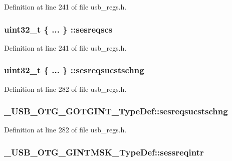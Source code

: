 Definition at line 241 of file usb\-\_\-regs.\-h.

\hypertarget{group___u_s_b___o_t_g___d_r_i_v_e_r_ga6f20faaa5eb3d10f213ac9d2d48d0452}{
\subsubsection[{sesreqscs}]{\setlength{\rightskip}{0pt plus 5cm}uint32\-\_\-t \{ ... \} \-::sesreqscs}}\label{group___u_s_b___o_t_g___d_r_i_v_e_r_ga6f20faaa5eb3d10f213ac9d2d48d0452}


Definition at line 241 of file usb\-\_\-regs.\-h.

\hypertarget{group___u_s_b___o_t_g___d_r_i_v_e_r_ga47aedfcdccf66bc5a3f43306e62526ec}{
\subsubsection[{sesreqsucstschng}]{\setlength{\rightskip}{0pt plus 5cm}uint32\-\_\-t \{ ... \} \-::sesreqsucstschng}}\label{group___u_s_b___o_t_g___d_r_i_v_e_r_ga47aedfcdccf66bc5a3f43306e62526ec}


Definition at line 282 of file usb\-\_\-regs.\-h.

\hypertarget{group___u_s_b___o_t_g___d_r_i_v_e_r_gae1b7683211f53c2ae86a79983383a49f}{
\subsubsection[{sesreqsucstschng}]{ \-\_\-\-U\-S\-B\-\_\-\-O\-T\-G\-\_\-\-G\-O\-T\-G\-I\-N\-T\-\_\-\-Type\-Def\-::sesreqsucstschng}}\label{group___u_s_b___o_t_g___d_r_i_v_e_r_gae1b7683211f53c2ae86a79983383a49f}


Definition at line 282 of file usb\-\_\-regs.\-h.

\hypertarget{group___u_s_b___o_t_g___d_r_i_v_e_r_ga66a6d3b64dd0fe06a69a20da548ffa12}{
\subsubsection[{sessreqintr}]{ \-\_\-\-U\-S\-B\-\_\-\-O\-T\-G\-\_\-\-G\-I\-N\-T\-M\-S\-K\-\_\-\-Type\-Def\-::sessreqintr}}\label{group___u_s_b___o_t_g___d_r_i_v_e_r_ga66a6d3b64dd0fe06a69a20da548ffa12}


